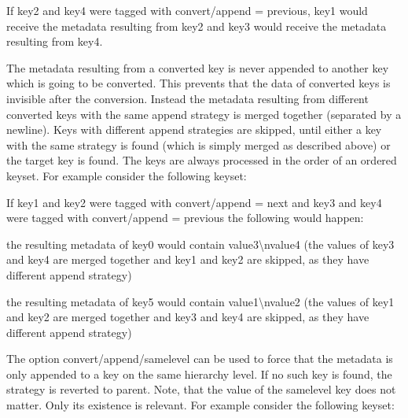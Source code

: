 \begin{DoxyCode}{0}
\end{DoxyCode}


If key2 and key4 were tagged with {\ttfamily convert/append = previous}, key1 would receive the metadata resulting from key2 and key3 would receive the metadata resulting from key4.

The metadata resulting from a converted key is never appended to another key which is going to be converted. This prevents that the data of converted keys is invisible after the conversion. Instead the metadata resulting from different converted keys with the same append strategy is merged together (separated by a newline). Keys with different append strategies are skipped, until either a key with the same strategy is found (which is simply merged as described above) or the target key is found. The keys are always processed in the order of an ordered keyset. For example consider the following keyset\+:


\begin{DoxyCode}{0}
\end{DoxyCode}


If key1 and key2 were tagged with {\ttfamily convert/append = next} and key3 and key4 were tagged with {\ttfamily convert/append = previous} the following would happen\+:


\begin{DoxyItemize}
\item the resulting metadata of key0 would contain {\ttfamily value3\textbackslash{}nvalue4} (the values of key3 and key4 are merged together and key1 and key2 are skipped, as they have different append strategy)
\item the resulting metadata of key5 would contain {\ttfamily value1\textbackslash{}nvalue2} (the values of key1 and key2 are merged together and key3 and key4 are skipped, as they have different append strategy)
\end{DoxyItemize}

The option {\ttfamily convert/append/samelevel} can be used to force that the metadata is only appended to a key on the same hierarchy level. If no such key is found, the strategy is reverted to parent. Note, that the value of the samelevel key does not matter. Only its existence is relevant. For example consider the following keyset\+:



